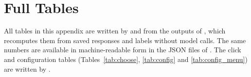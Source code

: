 \section{Full Tables}\label{app:tables}

All tables in this appendix are written by  and  from the outputs of , which recomputes them from saved responses and labels without model calls. The same numbers are available in machine-readable form in the JSON files of . The click and configuration tables (Tables~\ref{tab:choose}, \ref{tab:config} and \ref{tab:config_menu}) are written by .










